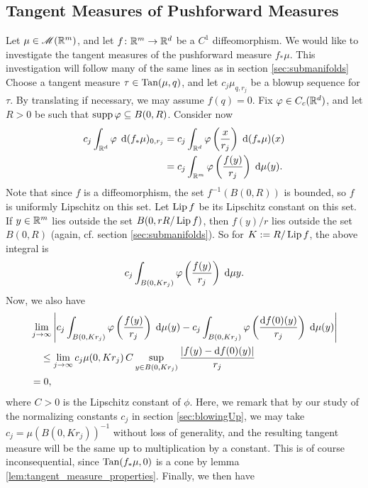 \subsection{Tangent Measures of Pushforward Measures} \label{sec:pushforward}
Let $\mu \in \mathscr{M}(\mathbb{R}^m)$, and let $f \colon \mathbb{R}^m \to \mathbb{R}^d$ be a $C^1$ diffeomorphism. We would like to investigate the tangent measures of the pushforward measure $f_*\mu$. This investigation will follow many of the same lines as in section \ref{sec:submanifolds} Choose a tangent measure $\tau \in \operatorname{Tan}(\mu,q)$, and let $c_j \mu_{q,r_j}$ be a blowup sequence for $\tau$. By translating if necessary, we may assume $f(q) = 0$. Fix $\varphi \in C_c(\mathbb{R}^d)$, and let $R > 0$ be such that $\operatorname{supp}{\varphi} \subseteq B(0,R)$. Consider now 
\begin{equation} \begin{aligned}
    c_j \int_{\mathbb{R}^d} \varphi \; \operatorname{d}\!{(}f_*\mu)_{0,r_j} &= c_j \int_{\mathbb{R}^d} \varphi\left( {\frac{x}{r_j}} \right) \; \operatorname{d}\!{(}f_* \mu)(x) \\
                                               &= c_j \int_{\mathbb{R}^m} \varphi\left( {\frac{f(y)}{r_j}} \right) \; \operatorname{d}\!{\mu}(y).
\end{aligned} \end{equation}
Note that since $f$ is a diffeomorphism, the set $f^{-1}(B(0,R))$ is bounded, so $f$ is uniformly Lipschitz on this set. Let $\operatorname{Lip}{f}$ be its Lipschitz constant on this set. If $y \in \mathbb{R}^m$ lies outside the set $B(0,rR/\operatorname{Lip}{f})$, then $f(y)/r$ lies outside the set $B(0,R)$ (again, cf. section \ref{sec:submanifolds}). So for $K := R/\operatorname{Lip}{f}$, the above integral is 
\begin{equation}
    c_j \int_{B(0,Kr_j)} \varphi\left( {\frac{f(y)}{r_j}} \right) \; \operatorname{d}\!{\mu}{y}.
\end{equation}
Now, we also have 
\begin{equation} \begin{aligned}
    &\lim_{j \to \infty} \left\vert { c_j \int_{B(0,Kr_j)} \varphi\left( {\frac{f(y)}{r_j}} \right) \; \ensuremath{\operatorname{d}\!{\mu}}(y) - c_j \int_{B(0,Kr_j)} \varphi\left( {\frac{\ensuremath{\operatorname{d}\!{f}}(0)(y)}{r_j}} \right) \; \ensuremath{\operatorname{d}\!{\mu}}(y) } \right\vert \\
    &\quad \leq \lim_{j \to \infty} c_j \mu(0,Kr_j) \, C \sup_{y \in B(0,Kr_j)} \frac{\left\vert {f(y) - \ensuremath{\operatorname{d}\!{f}}(0)(y)} \right\vert}{r_j} \\
    &= 0,
\end{aligned} \end{equation}
where $C > 0$ is the Lipschitz constant of $\phi$. Here, we remark that by our study of the normalizing constants $c_j$ in section \ref{sec:blowingUp}, we may take $c_j = \mu(B(0,Kr_j))^{-1}$ without loss of generality, and the resulting tangent measure will be the same up to multiplication by a constant. This is of course inconsequential, since $\operatorname{Tan}(f_*\mu,0)$ is a cone by lemma \ref{lem:tangent_measure_properties}. Finally, we then have 

